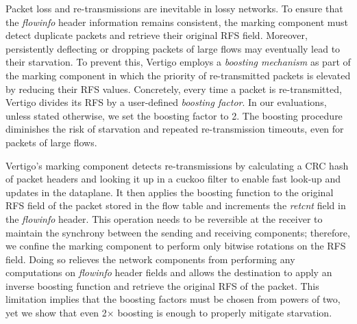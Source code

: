 Packet loss and re-transmissions are inevitable in lossy networks. To ensure that the \textit{flowinfo} header information remains consistent, the marking component must detect duplicate packets and retrieve their original RFS field.
Moreover, persistently deflecting or dropping packets of large flows may eventually lead to their starvation. 
To prevent this, Vertigo employs a \textit{boosting mechanism} as part of the marking component in which the priority of re-transmitted packets is elevated by reducing their RFS values. Concretely, every time a packet is re-transmitted, Vertigo divides its RFS by a user-defined \textit{boosting factor}. In our evaluations, unless stated otherwise, we set the boosting factor to 2.
The boosting procedure
diminishes the risk of starvation and repeated re-transmission timeouts, even for packets of large flows. 

Vertigo's marking component detects re-transmissions by calculating a CRC hash of packet headers and looking it up in a cuckoo filter \cite{cuckoo} to enable fast look-up and updates in the dataplane. It then applies the boosting function to the original RFS field of the packet stored in the flow 
table and increments the \textit{retcnt} field in the \textit{flowinfo} header. This operation needs to be reversible at the receiver to maintain the synchrony between the sending and receiving components; therefore, we confine the marking component to perform only bitwise rotations on the RFS field. Doing so relieves the network components from performing any computations on \textit{flowinfo} header fields and allows the destination to apply an inverse boosting function and retrieve the original RFS of the packet.
This limitation implies that the boosting factors must be chosen from powers of two, yet we show that even 2$\times$ boosting is enough to properly mitigate starvation.


